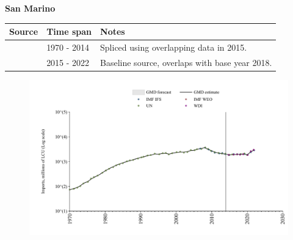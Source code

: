 \documentclass[12pt,a4paper,landscape]{article}
\begin{document}
\begin{adjustbox}{max totalsize={\paperwidth}{\paperheight},center}
\begin{minipage}[t][\textheight][t]{\textwidth}
\vspace*{0.5cm}
{}
\begin{center}
{\Large\bfseries San Marino}
\end{center}
\vspace{0.5cm}
\begin{table}[H]
\centering
\small
\begin{tabular}{|l|l|l|}
\hline
\textbf{Source} & \textbf{Time span} & \textbf{Notes} \\
\hline
\rowcolor{white}\cite{UN}& 1970 - 2014 &Spliced using overlapping data in 2015.\\
\rowcolor{lightgray}\cite{WDI}& 2015 - 2022 &Baseline source, overlaps with base year 2018.\\
\hline
\end{tabular}
\end{table}
\begin{figure}[H]
\centering
\includegraphics[width=\textwidth,height=0.6\textheight,keepaspectratio]{graphs/SMR_imports.pdf}
\end{figure}
\end{minipage}
\end{adjustbox}
\end{document}
